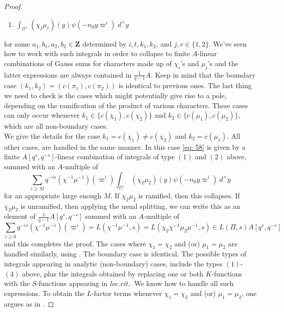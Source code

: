 \documentclass{amsart}
\theoremstyle{plain}
\theoremstyle{plain}
\theoremstyle{remark}
\begin{document}
\begin{proof}
\begin{enumerate}
            \item ${\displaystyle\int_{\mathcal{O}^\times}(\chi_j\mu_r)(y)\psi(-n_0y\varpi^{i})\ d^\times y}$
        \end{enumerate}
        for some $a_1,b_1,a_2,b_2\in\mathbf{Z}$ determined by $i,t,k_1,k_2$, and $j,r\in\{1,2\}$. We've seen how to work with such integrals in order to collapse to finite $A$-linear combinations of Gauss sums for characters made up of $\chi_i$'s and $\mu_j$'s and the latter expressions are always contained in $\tfrac{1}{q-1}A$. Keep in mind that the boundary case $(k_1,k_2)=(c(\pi_1),c(\pi_2))$ is identical to previous ones.
        The last thing we need to check is the cases which might potentially give rise to a pole, depending on the ramification of the product of various characters. These cases can only occur whenever $k_1\in\{c(\chi_1),c(\chi_2)\}$ and $ k_2\in \{c(\mu_1),c(\mu_2)\}$, which are all non-boundary cases.\\
        We give the details for the case $k_1=c(\chi_1)\neq c(\chi_2)$ and $k_2=c(\mu_1)$. All other cases, are handled in the same manner. In this case \eqref{eq: 58} is given by a finite $A[q^s,q^{-s}]$-linear combination of integrals of type $(1)$ and $(2)$ above, summed with an $A$-multiple of
        $$\sum_{i\geq M}q^{-is}(\chi^{-1}\mu^{-1})(\varpi^i)\int_{\mathcal{O}^\times}(\chi_2\mu_2)(y)\psi(-n_0y\varpi^i)\ d^\times y$$
        for an appropriate large enough $M$.
        If $\chi_2\mu_2$ is ramified, then this collapses. If $\chi_2\mu_2$ is unramified, then applying the usual splitting, we can write this as an element of $\tfrac{1}{q-1}A[q^s,q^{-s}]$ summed with an $A$-multiple of
        $$\sum_{i\geq 0}q^{-is}(\chi^{-1}\mu^{-1})(\varpi^i)=L(\chi^{-1}\mu^{-1},s)=L(\chi_2\chi^{-1}\mu_2\mu^{-1},s)\in L(\Pi,s)A[q^s,q^{-s}]$$
        and this completes the proof. The cases where $\chi_1=\chi_2$ and (or) $\mu_1=\mu_2$ are handled similarly, using \cite[Lemma $3.5$]{Assing_2018}. The boundary case is identical. The possible types of integrals appearing in analytic (non-boundary) cases, include the types $(1)$-$(4)$ above, plus the integrals obtained by replacing one or both $K$-functions with the $S$-functions appearing in \textit{loc.cit.}. We know how to handle all such expressions. To obtain the $L$-factor terms whenever $\chi_1=\chi_2$ and (or) $\mu_1=\mu_2$, one argues as in .
\end{proof}
\end{document}
